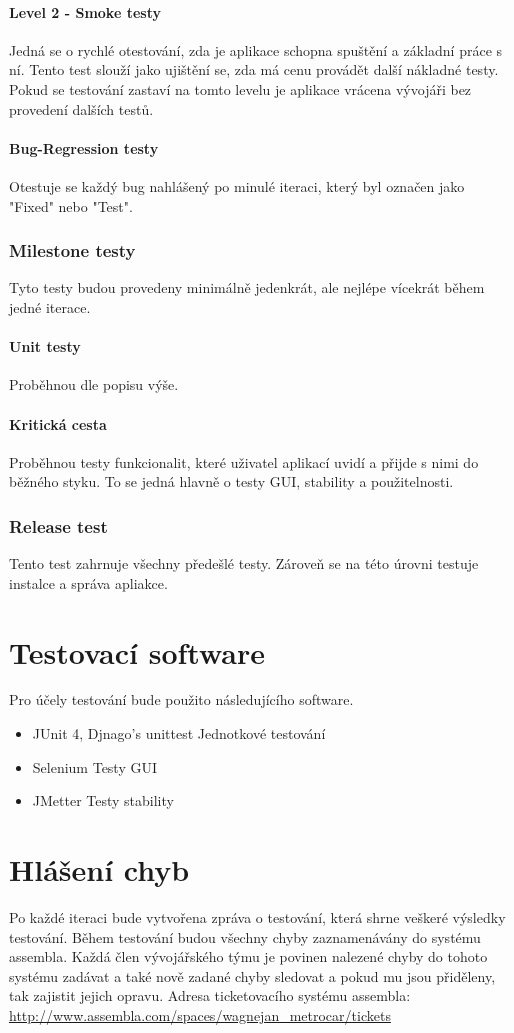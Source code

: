 \documentclass[a4paper,titlepage]{article}
\begin{document}
\paragraph{Level 2 - Smoke testy}
Jedná se o rychlé otestování, zda je aplikace schopna spuštění a základní práce s ní. Tento test slouží jako ujištění se, zda má cenu provádět další nákladné testy. Pokud se testování zastaví na tomto levelu je aplikace vrácena vývojáři bez provedení dalších testů.
\paragraph{Bug-Regression testy}
Otestuje se každý bug nahlášený po minulé iteraci, který byl označen jako "Fixed" nebo "Test".
\subsubsection{Milestone testy}
Tyto testy budou provedeny minimálně jedenkrát, ale nejlépe vícekrát během jedné iterace.
\paragraph{Unit testy}
Proběhnou dle popisu výše.
\paragraph{Kritická cesta}
Proběhnou testy funkcionalit, které uživatel aplikací uvidí a přijde s nimi do běžného styku.
To se jedná hlavně o testy GUI, stability a použitelnosti.
\subsubsection{Release test}
Tento test zahrnuje všechny předešlé testy. Zároveň se na této úrovni testuje instalce a správa apliakce.
\section{Testovací software}
Pro účely testování bude použito následujícího software.
\begin{itemize}
	\item JUnit 4, Djnago's unittest
		Jednotkové testování
	\item Selenium
		Testy GUI
	\item JMetter
		Testy stability
\end{itemize}
\section{Hlášení chyb}
Po každé iteraci bude vytvořena zpráva o testování, která shrne veškeré výsledky testování.
Během testování budou všechny chyby zaznamenávány do systému assembla. Každá člen vývojářského týmu je povinen nalezené chyby do tohoto systému zadávat a také nově zadané chyby sledovat a pokud mu jsou přiděleny, tak zajistit jejich opravu.
Adresa ticketovacího systému assembla: \url{http://www.assembla.com/spaces/wagnejan_metrocar/tickets}
\end{document}
